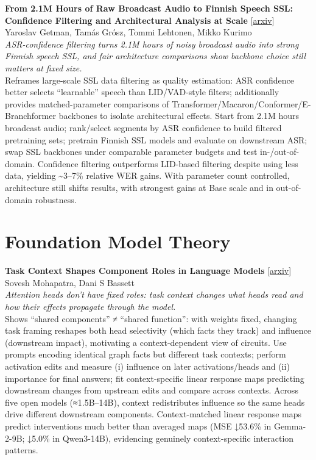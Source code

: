 \documentclass[12pt,letterpaper]{article}
\begin{document}
\medskip

{\small\textbf{From 2.1M Hours of Raw Broadcast Audio to Finnish Speech SSL: Confidence Filtering and Architectural Analysis at Scale}} {\scriptsize[\href{https://arxiv.org/abs/2610.13102}{arxiv}]}\\
{\scriptsize Yaroslav Getman, Tam\'as Gr\'osz, Tommi Lehtonen, Mikko Kurimo}\\

{\small\textit{ASR-confidence filtering turns 2.1M hours of noisy broadcast audio into strong Finnish speech SSL, and fair architecture comparisons show backbone choice still matters at fixed size.}}\\[1pt]
{\footnotesize Reframes large-scale SSL data filtering as quality estimation: ASR confidence better selects ``learnable'' speech than LID/VAD-style filters; additionally provides matched-parameter comparisons of Transformer/Macaron/Conformer/E-Branchformer backbones to isolate architectural effects. Start from 2.1M hours broadcast audio; rank/select segments by ASR confidence to build filtered pretraining sets; pretrain Finnish SSL models and evaluate on downstream ASR; swap SSL backbones under comparable parameter budgets and test in-/out-of-domain. Confidence filtering outperforms LID-based filtering despite using less data, yielding \textasciitilde{}3--7\% relative WER gains. With parameter count controlled, architecture still shifts results, with strongest gains at Base scale and in out-of-domain robustness.}

\medskip


\section*{Foundation Model Theory}

{\small\textbf{Task Context Shapes Component Roles in Language Models}} {\scriptsize[\href{https://arxiv.org/abs/2610.13895}{arxiv}]}\\
{\scriptsize Sovesh Mohapatra, Dani S Bassett}\\

{\small\textit{Attention heads don't have fixed roles: task context changes what heads read and how their effects propagate through the model.}}\\[1pt]
{\footnotesize Shows ``shared components'' ≠ ``shared function'': with weights fixed, changing task framing reshapes both head selectivity (which facts they track) and influence (downstream impact), motivating a context-dependent view of circuits. Use prompts encoding identical graph facts but different task contexts; perform activation edits and measure (i) influence on later activations/heads and (ii) importance for final answers; fit context-specific linear response maps predicting downstream changes from upstream edits and compare across contexts. Across five open models (≈1.5B--14B), context redistributes influence so the same heads drive different downstream components. Context-matched linear response maps predict interventions much better than averaged maps (MSE ↓53.6\% in Gemma-2-9B; ↓5.0\% in Qwen3-14B), evidencing genuinely context-specific interaction patterns.}
\end{document}
